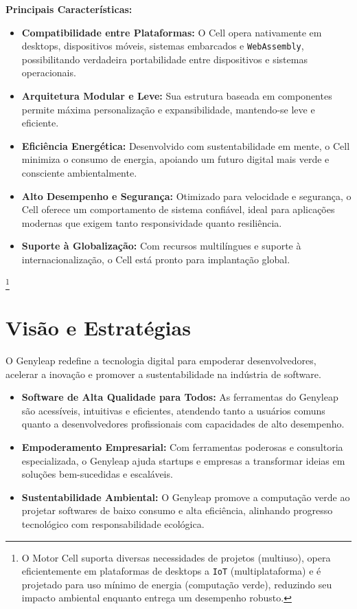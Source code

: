 \documentclass[a4paper,12pt,openany]{book}
\begin{document}
\textbf{Principais Características:}
\begin{itemize}
    \item \textbf{Compatibilidade entre Plataformas:} O Cell opera nativamente em desktops, dispositivos móveis, sistemas embarcados e \texttt{WebAssembly}, possibilitando verdadeira portabilidade entre dispositivos e sistemas operacionais.
    \item \textbf{Arquitetura Modular e Leve:} Sua estrutura baseada em componentes permite máxima personalização e expansibilidade, mantendo-se leve e eficiente.
    \item \textbf{Eficiência Energética:} Desenvolvido com sustentabilidade em mente, o Cell minimiza o consumo de energia, apoiando um futuro digital mais verde e consciente ambientalmente.
    \item \textbf{Alto Desempenho e Segurança:} Otimizado para velocidade e segurança, o Cell oferece um comportamento de sistema confiável, ideal para aplicações modernas que exigem tanto responsividade quanto resiliência.
    \item \textbf{Suporte à Globalização:} Com recursos multilíngues e suporte à internacionalização, o Cell está pronto para implantação global.
\end{itemize}

\footnote{O Motor Cell suporta diversas necessidades de projetos (multiuso), opera eficientemente em plataformas de desktops a \texttt{IoT} (multiplataforma) e é projetado para uso mínimo de energia (computação verde), reduzindo seu impacto ambiental enquanto entrega um desempenho robusto.}

\chapter{Visão e Estratégias}

O Genyleap redefine a tecnologia digital para empoderar desenvolvedores, acelerar a inovação e promover a sustentabilidade na indústria de software.

\begin{itemize}
    \item \textbf{Software de Alta Qualidade para Todos:} As ferramentas do Genyleap são acessíveis, intuitivas e eficientes, atendendo tanto a usuários comuns quanto a desenvolvedores profissionais com capacidades de alto desempenho.
    \item \textbf{Empoderamento Empresarial:} Com ferramentas poderosas e consultoria especializada, o Genyleap ajuda startups e empresas a transformar ideias em soluções bem-sucedidas e escaláveis.
    \item \textbf{Sustentabilidade Ambiental:} O Genyleap promove a computação verde ao projetar softwares de baixo consumo e alta eficiência, alinhando progresso tecnológico com responsabilidade ecológica.
\end{itemize}
\end{document}
